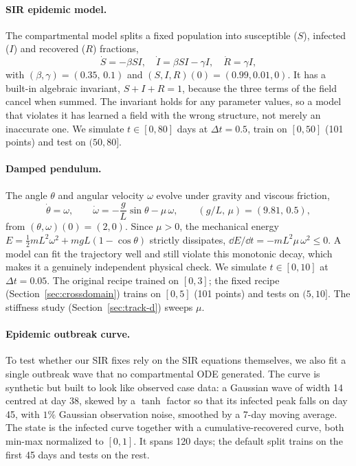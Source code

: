 \paragraph{SIR epidemic model.} The compartmental model splits a fixed
population into susceptible ($S$), infected ($I$) and recovered ($R$)
fractions,
\begin{equation}
\dot S = -\beta S I, \quad \dot I = \beta S I - \gamma I, \quad \dot R = \gamma I,
\label{eq:sir}
\end{equation}
with $(\beta,\gamma)=(0.35,\,0.1)$ and $(S,I,R)(0)=(0.99,0.01,0)$. It has
a built-in algebraic invariant, $S+I+R=1$, because the three terms of the
field cancel when summed. The invariant holds for any parameter values, so a
model that violates it has learned a field with the wrong structure, not
merely an inaccurate one. We simulate $t\in[0,80]$ days at
$\Delta t=0.5$, train on $[0,50]$ (101 points) and test on $(50,80]$.

\paragraph{Damped pendulum.} The angle $\theta$ and angular velocity
$\omega$ evolve under gravity and viscous friction,
\begin{equation}
\dot\theta = \omega, \qquad \dot\omega = -\frac{g}{L}\sin\theta - \mu\,\omega,
\qquad (g/L,\,\mu) = (9.81,\,0.5),
\label{eq:pendulum}
\end{equation}
from $(\theta,\omega)(0)=(2,0)$. Since $\mu>0$, the mechanical energy
$E=\tfrac{1}{2}mL^2\omega^2 + mgL(1-\cos\theta)$ strictly dissipates,
$\dd E/\dd t = -mL^2\mu\,\omega^2 \le 0$. A model can fit the trajectory
well and still violate this monotonic decay, which makes it a genuinely
independent physical check. We simulate $t\in[0,10]$ at $\Delta t=0.05$.
The original recipe trained on $[0,3]$; the fixed recipe
(Section~\ref{sec:crossdomain}) trains on $[0,5]$ (101 points) and tests on
$(5,10]$. The stiffness study (Section~\ref{sec:track-d}) sweeps $\mu$.

\paragraph{Epidemic outbreak curve.} To test whether our SIR fixes rely on
the SIR equations themselves, we also fit a single outbreak wave that no
compartmental ODE generated. The curve is synthetic but built to look like
observed case data: a Gaussian wave of width 14 centred at day 38, skewed by
a $\tanh$ factor so that its infected peak falls on day 45, with $1\%$
Gaussian observation noise,
smoothed by a 7-day moving average. The state is the infected curve together
with a cumulative-recovered curve, both min-max normalized to $[0,1]$. It
spans 120 days; the default split trains on the first 45 days and tests on
the rest.

